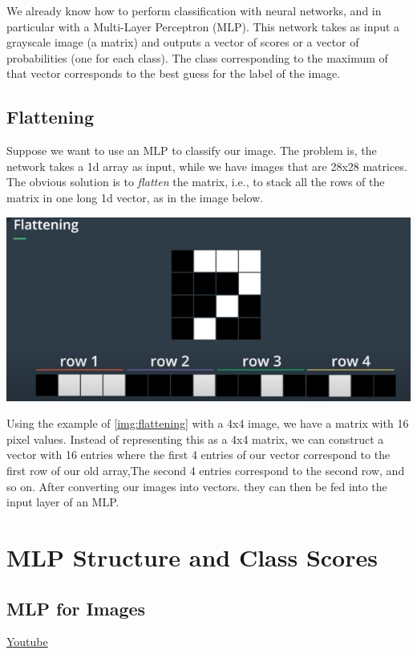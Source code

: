 We already know how to perform classification with neural networks, and in particular with a Multi-Layer Perceptron (MLP). This network takes as input a grayscale image (a matrix) and outputs a vector of scores or a vector of probabilities (one for each class). The class corresponding to the maximum of that vector corresponds to the best guess for the label of the image.

\subsection{Flattening}

Suppose we want to use an MLP to classify our image. The problem is, the network takes a 1d array as input, while we have images that are 28x28 matrices. The obvious solution is to \textit{flatten} the matrix, i.e., to stack all the rows of the matrix in one long 1d vector, as in the image below.

\includegraphics[width=0.75\linewidth]{img//cnn/flattening-bw.jpeg}
\label{img:flattening}

Using the example of \autoref{img:flattening} with a 4x4 image, we have a matrix with 16 pixel values. Instead of representing this as a 4x4 matrix, we can construct a vector with 16 entries where the first 4 entries of our vector correspond to the first row of our old array,The second 4 entries correspond to the second row, and so on. After converting our images into vectors. they can then be fed into the input layer of an MLP. 

\section{MLP Structure and Class Scores}

\subsection{MLP for Images}
\href{https://www.youtube.com/watch?v=4zFq5U1IHgU&ab_channel=Udacity}{Youtube} \newline


